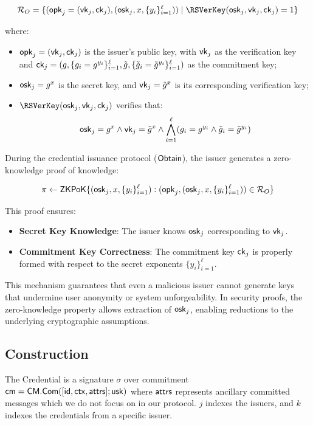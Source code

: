 \[
\mathcal{R}_O = \{ (\opk_j = (\vk_j, \ck_j), (\osk_j, x, \{y_i\}_{i=1}^\ell)) \mid \RSVerKey(\osk_j, \vk_j, \ck_j) = 1 \}
\]

where:
\begin{itemize}
    \item $\mathsf{opk}_j = (\mathsf{vk}_j, \mathsf{ck}_j)$ is the issuer’s public key, with $\mathsf{vk}_j$ as the verification key and $\mathsf{ck}_j = (g, \{g_i = g^{y_i}\}_{i=1}^\ell, \tilde{g}, \{\tilde{g}_i = \tilde{g}^{y_i}\}_{i=1}^\ell)$ as the commitment key;
    \item $\mathsf{osk}_j = g^x$ is the secret key, and $\mathsf{vk}_j = \tilde{g}^x$ is its corresponding verification key;
    \item $\RSVerKey(\osk_j, \vk_j, \ck_j)$ verifies that:
    \[
    \mathsf{osk}_j = g^x \land \mathsf{vk}_j = \tilde{g}^x \land \bigwedge_{i=1}^\ell (g_i = g^{y_i} \land \tilde{g}_i = \tilde{g}^{y_i})
    \]
\end{itemize}

During the credential issuance protocol ($\mathsf{Obtain}$), the issuer generates a zero-knowledge proof of knowledge:

\[
\pi \gets \mathsf{ZKPoK}\{ (\mathsf{osk}_j, x, \{y_i\}_{i=1}^\ell) : (\mathsf{opk}_j, (\mathsf{osk}_j, x, \{y_i\}_{i=1}^\ell)) \in \mathcal{R}_O \}
\]

This proof ensures:
\begin{itemize}
    \item \textbf{Secret Key Knowledge}: The issuer knows $\mathsf{osk}_j$ corresponding to $\mathsf{vk}_j$.
    \item \textbf{Commitment Key Correctness}: The commitment key $\mathsf{ck}_j$ is properly formed with respect to the secret exponents $\{y_i\}_{i=1}^\ell$.
\end{itemize}

This mechanism guarantees that even a malicious issuer cannot generate keys that undermine user anonymity or system unforgeability. In security proofs, the zero-knowledge property allows extraction of $\mathsf{osk}_j$, enabling reductions to the underlying cryptographic assumptions.


\newpage
\subsection{\MIMCABC Construction}
The Credential is a signature $\sigma$ over commitment $\mathsf{cm} = \mathsf{CM.Com}([\mathsf{id}, \mathsf{ctx}, \mathsf{attrs}]; \mathsf{usk})$ where $\mathsf{attrs}$ represents ancillary committed messages which we do not focus on in our protocol. $j$ indexes the issuers, and $k$ indexes the credentials from a specific issuer. 

